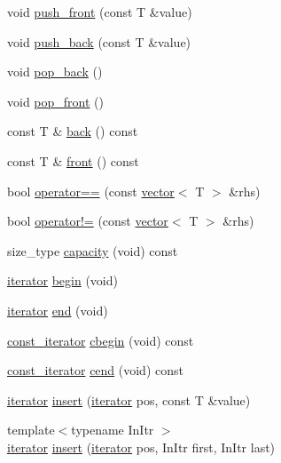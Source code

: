 \begin{DoxyCompactItemize}
\item 
void \mbox{\hyperlink{classsc_1_1vector_a6af9e24185373de9b47507cb868667fe}{push\+\_\+front}} (const T \&value)
\item 
void \mbox{\hyperlink{classsc_1_1vector_a4cf27b8604e2465550bcc2f36405d3dc}{push\+\_\+back}} (const T \&value)
\item 
void \mbox{\hyperlink{classsc_1_1vector_a1d32a5d62fa75707a4a6a5781e1030ea}{pop\+\_\+back}} ()
\item 
void \mbox{\hyperlink{classsc_1_1vector_abd1b780aa2d88a981e36ca6cc40c2e51}{pop\+\_\+front}} ()
\item 
const T \& \mbox{\hyperlink{classsc_1_1vector_ad0b2d8bbc192a8cf340636fb66d26786}{back}} () const
\item 
const T \& \mbox{\hyperlink{classsc_1_1vector_acc1c96630d9a746903411b17240d265d}{front}} () const
\item 
bool \mbox{\hyperlink{classsc_1_1vector_a764f351207d5e530d8e9e936b972f290}{operator==}} (const \mbox{\hyperlink{classsc_1_1vector}{vector}}$<$ T $>$ \&rhs)
\item 
bool \mbox{\hyperlink{classsc_1_1vector_a22ba85b963cc80ec631017a5460ea393}{operator!=}} (const \mbox{\hyperlink{classsc_1_1vector}{vector}}$<$ T $>$ \&rhs)
\item 
size\+\_\+type \mbox{\hyperlink{classsc_1_1vector_acf5f0cebfb797dac6eb42523d1e7511a}{capacity}} (void) const
\item 
\mbox{\hyperlink{classsc_1_1vector_1_1iterator}{iterator}} \mbox{\hyperlink{classsc_1_1vector_ae198130cd01e8d5a4df07d6567b51eb4}{begin}} (void)
\item 
\mbox{\hyperlink{classsc_1_1vector_1_1iterator}{iterator}} \mbox{\hyperlink{classsc_1_1vector_a15b7f4313d7a011694d154c030768ad3}{end}} (void)
\item 
\mbox{\hyperlink{classsc_1_1vector_1_1const__iterator}{const\+\_\+iterator}} \mbox{\hyperlink{classsc_1_1vector_abf97464250caf4653a104fff421943c8}{cbegin}} (void) const
\item 
\mbox{\hyperlink{classsc_1_1vector_1_1const__iterator}{const\+\_\+iterator}} \mbox{\hyperlink{classsc_1_1vector_aa6a2e50e9f3eec904cf6ec0f357c8180}{cend}} (void) const
\item 
\mbox{\hyperlink{classsc_1_1vector_1_1iterator}{iterator}} \mbox{\hyperlink{classsc_1_1vector_ac55608c5cee9a8311cbe7c4fde998a9f}{insert}} (\mbox{\hyperlink{classsc_1_1vector_1_1iterator}{iterator}} pos, const T \&value)
\item 
{\footnotesize template$<$typename In\+Itr $>$ }\\\mbox{\hyperlink{classsc_1_1vector_1_1iterator}{iterator}} \mbox{\hyperlink{classsc_1_1vector_a4cc533cc8f7fbd95ee965583650ee085}{insert}} (\mbox{\hyperlink{classsc_1_1vector_1_1iterator}{iterator}} pos, In\+Itr first, In\+Itr last)

\end{DoxyCompactItemize}
